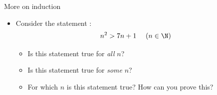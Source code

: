 \documentclass[11pt,aspectratio=1610,handout]{beamer}
\begin{document}
\begin{frame}{More on induction}
	\begin{itemize}
		\item Consider the statement : 
		\[
		n^2 > 7n+1~~~~ (n \in \N)
		\]
		\vspace{-0.2in}\p
		\begin{itemize}
			\item Is this statement true for \emph{all} $n$? 
			\item Is this statement true for \emph{some} $n$? 
			\item For which $n$ is this statement true? How can you prove this? 
		\end{itemize}\p
	\end{itemize}		
	\vspace{0in}
	\hspace{0cm}
\end{frame}
\end{document}
